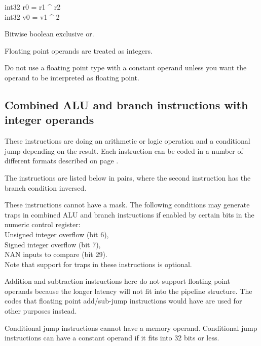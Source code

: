 \documentclass[forwardcom.tex]{subfiles}
\begin{document}
int32 r0 = r1 \^{} r2 \\
int32 v0 = v1 \^{} 2
\vspace{2mm}

Bitwise boolean exclusive or.
\vspace{2mm}

Floating point operands are treated as integers.

Do not use a floating point type with a constant operand unless you want the operand to be interpreted as floating point.
\vspace{2mm}


\subsection{Combined ALU and branch instructions with integer operands}
\label{descriptionOfControlTransferInstructions}
These instructions are doing an arithmetic or logic operation and a conditional jump
depending on the result. Each instruction can be coded in a number of different formats
described on page \pageref{table:jumpInstructionFormats}.
\vspace{2mm}

The instructions are listed below in pairs, where the second instruction has the branch condition inversed.
\vspace{2mm}

These instructions cannot have a mask. The following conditions may generate traps in combined ALU and branch instructions if enabled by certain bits in the numeric control register: \\
\hspace{5mm} Unsigned integer overflow (bit 6), \\
\hspace{5mm} Signed integer overflow (bit 7), \\
\hspace{5mm} NAN inputs to compare (bit 29).\\
Note that support for traps in these instructions is optional.
\vspace{2mm}

Addition and subtraction instructions here do not support floating point operands because the longer latency will not fit into the pipeline structure. The codes that floating point add/sub-jump instructions would have are used for other purposes instead.
\vspace{2mm}

Conditional jump instructions cannot have a memory operand. Conditional jump instructions can have a constant operand if it fits into 32 bits or less.
\vspace{2mm}
\end{document}
